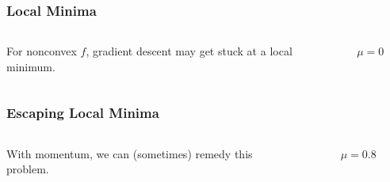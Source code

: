 \documentclass[aspectratio=1610,onlytextwidth]{beamer}
\begin{document}
\begin{frame}[c]
  \frametitle{Local Minima}

  \begin{columns}
    \begin{column}{0.45\textwidth}
      For nonconvex \(f\), gradient descent may get stuck at a local minimum.
    \end{column}

    \begin{column}{0.45\textwidth}
      \begin{figure}[htpb]
        \centering
        \caption{%
          $\mu = 0$
        }
      \end{figure}
    \end{column}
  \end{columns}

\end{frame}

\begin{frame}[c]
  \frametitle{Escaping Local Minima}

  \begin{columns}
    \begin{column}{0.45\textwidth}
      With momentum, we can (sometimes) remedy this problem.
    \end{column}
    \begin{column}{0.45\textwidth}
      \begin{figure}[htpb]
        \centering
        \caption{%
          $\mu = 0.8$
        }
      \end{figure}
    \end{column}
  \end{columns}

\end{frame}
\end{document}
